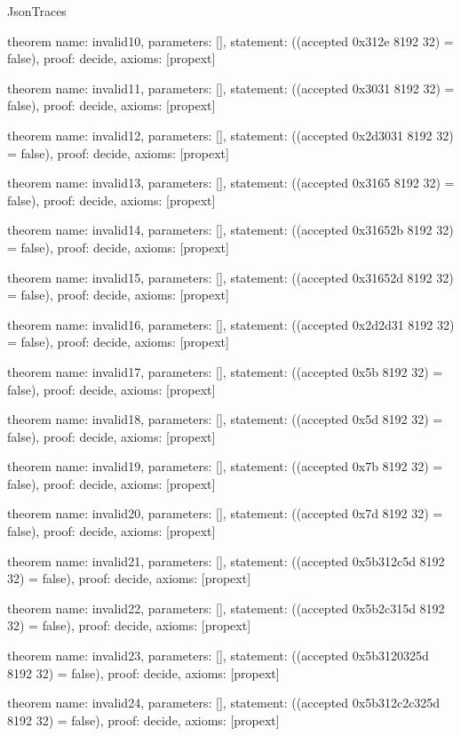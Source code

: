 \begin{lexlean}{JsonTraces}
\begin{semanticmodule}
theorem{
  name: invalid10,
  parameters: [],
  statement: ((accepted 0x312e 8192 32) = false),
  proof: decide{},
  axioms: [propext]
}

theorem{
  name: invalid11,
  parameters: [],
  statement: ((accepted 0x3031 8192 32) = false),
  proof: decide{},
  axioms: [propext]
}

theorem{
  name: invalid12,
  parameters: [],
  statement: ((accepted 0x2d3031 8192 32) = false),
  proof: decide{},
  axioms: [propext]
}

theorem{
  name: invalid13,
  parameters: [],
  statement: ((accepted 0x3165 8192 32) = false),
  proof: decide{},
  axioms: [propext]
}

theorem{
  name: invalid14,
  parameters: [],
  statement: ((accepted 0x31652b 8192 32) = false),
  proof: decide{},
  axioms: [propext]
}

theorem{
  name: invalid15,
  parameters: [],
  statement: ((accepted 0x31652d 8192 32) = false),
  proof: decide{},
  axioms: [propext]
}

theorem{
  name: invalid16,
  parameters: [],
  statement: ((accepted 0x2d2d31 8192 32) = false),
  proof: decide{},
  axioms: [propext]
}

theorem{
  name: invalid17,
  parameters: [],
  statement: ((accepted 0x5b 8192 32) = false),
  proof: decide{},
  axioms: [propext]
}

theorem{
  name: invalid18,
  parameters: [],
  statement: ((accepted 0x5d 8192 32) = false),
  proof: decide{},
  axioms: [propext]
}

theorem{
  name: invalid19,
  parameters: [],
  statement: ((accepted 0x7b 8192 32) = false),
  proof: decide{},
  axioms: [propext]
}

theorem{
  name: invalid20,
  parameters: [],
  statement: ((accepted 0x7d 8192 32) = false),
  proof: decide{},
  axioms: [propext]
}

theorem{
  name: invalid21,
  parameters: [],
  statement: ((accepted 0x5b312c5d 8192 32) = false),
  proof: decide{},
  axioms: [propext]
}

theorem{
  name: invalid22,
  parameters: [],
  statement: ((accepted 0x5b2c315d 8192 32) = false),
  proof: decide{},
  axioms: [propext]
}

theorem{
  name: invalid23,
  parameters: [],
  statement: ((accepted 0x5b3120325d 8192 32) = false),
  proof: decide{},
  axioms: [propext]
}

theorem{
  name: invalid24,
  parameters: [],
  statement: ((accepted 0x5b312c2c325d 8192 32) = false),
  proof: decide{},
  axioms: [propext]
}


\end{semanticmodule}
\end{lexlean}
